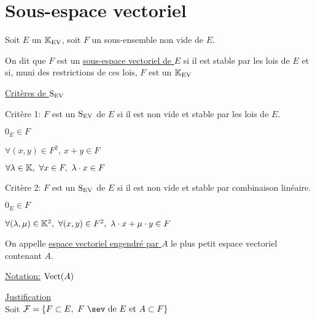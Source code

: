 \documentclass[12pt,twoside,a4paper]{article}
\begin{document}
	\section{Sous-espace vectoriel}
		Soit $E$ un $\K_\text{EV}$, soit $F$ un sous-ensemble non vide de $E$.
		\begin{defi}
			On dit que $F$ est un \underline{sous-espace vectoriel de $E$} si il est stable par les lois de $E$ et si, muni des restrictions de ces lois, $F$ est un $\K_\text{EV}$
		\end{defi}
		\begin{flushleft}
			\underline{Critères de $\Sev$}
			\begin{liste}
				\item Critère 1: $F$ est un $\Sev$ de $E$ si il est non vide et stable par les lois de $E$.
				\begin{liste}
					\item $0_E\in F$
					\item $\forall(x,y)\in F^{2},\ x+y\in F$
					\item $\forall \lambda\in\K,\ \forall x\in F,\ \lambda\cdot x\in F$
				\end{liste}
				\item Critère 2: $F$ est un $\Sev$ de $E$ si il est non vide et stable par combinaison linéaire.
				\begin{liste}
					\item $0_E\in F$
					\item $\forall (\lambda,\mu)\in\K^{2},\ \forall (x,y)\in F^{2},\ \lambda\cdot x+\mu\cdot y\in F$
				\end{liste}
			\end{liste}
		\end{flushleft}
		\begin{defi}
			On appelle \underline{espace vectoriel engendré par $A$} le plus petit espace vectoriel contenant $A$.
		\end{defi}
		\begin{flushleft}
			\underline{Notation:} $\vect(A)$
		\end{flushleft}
		\begin{flushleft}
			\underline{Justification}\\
			Soit $\mathcal{F}=\left\lbrace F\subset E,\ F\ \sev\text{ de }E\et A\subset F\right\rbrace $
			\begin{liste}
				\item $F_0=\bigcap\limits
			\end{liste}
		\end{flushleft}
\end{document}
